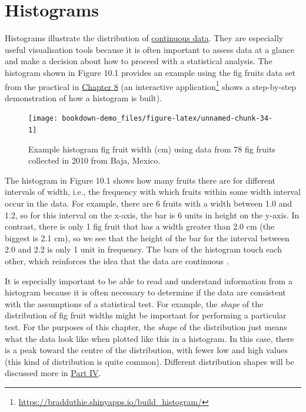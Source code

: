 \documentclass[
]{scrbook}
\begin{document}
\hypertarget{histograms}{%
\section{Histograms}\label{histograms}}

Histograms illustrate the distribution of \protect\hyperlink{Chapter_5}{continuous data}.
They are especially useful visualisation tools because it is often important to assess data at a glance and make a decision about how to proceed with a statistical analysis.
The histogram shown in Figure 10.1 provides an example using the fig fruits data set from the practical in \protect\hyperlink{Chapter_8}{Chapter 8} (an interactive application\footnote{\url{https://bradduthie.shinyapps.io/build_histogram/}} shows a step-by-step demonstration of how a histogram is built).

\begin{figure}
\texttt{[image: bookdown-demo\_files/figure-latex/unnamed-chunk-34-1]} \caption{Example histogram fig fruit width (cm) using data from 78 fig fruits collected in 2010 from Baja, Mexico.}\label{fig:unnamed-chunk-34}
\end{figure}

The histogram in Figure 10.1 shows how many fruits there are for different intervals of width, i.e., the frequency with which fruits within some width interval occur in the data.
For example, there are 6 fruits with a width between 1.0 and 1.2, so for this interval on the x-axis, the bar is 6 units in height on the y-axis.
In contrast, there is only 1 fig fruit that has a width greater than 2.0 cm (the biggest is 2.1 cm), so we see that the height of the bar for the interval between 2.0 and 2.2 is only 1 unit in frequency.
The bars of the histogram touch each other, which reinforces the idea that the data are continuous \citep{Dytham2011, Sokal1995}.

It is especially important to be able to read and understand information from a histogram because it is often necessary to determine if the data are consistent with the assumptions of a statistical test.
For example, the \emph{shape} of the distribution of fig fruit widths might be important for performing a particular test.
For the purposes of this chapter, the \emph{shape} of the distribution just means what the data look like when plotted like this in a histogram.
In this case, there is a peak toward the centre of the distribution, with fewer low and high values (this kind of distribution is quite common).
Different distribution shapes will be discussed more in \protect\hyperlink{Week4}{Part IV}.
\end{document}
